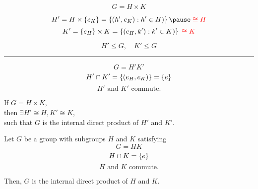 
\begin{frame}{}
  \[
	G = H \times K
  \]

  \begin{definition}
	\[
	  H' = H \times \set{e_{K}} = \set{(h', e_{K}): h' \in H)} \pause \;\red{\cong H}
	\]
	\pause \vspace{-0.50cm}
	\[
	  K' = \left\{e_{H}\right\} \times K = \left\{(e_{H}, k'): k' \in K)\right\} \;\textcolor{red}{\cong K}
	\]
  \end{definition}

  \pause
  \[
	H' \le G, \quad K' \le G
  \]

  \pause
  \vspace{-0.60cm}
  \begin{center}
	\rule{8cm}{0.6pt}
  \end{center}
  \vspace{-0.60cm}

  \[
	G = H'K'
  \]
  \pause \vspace{-0.30cm}
  \[
	H' \cap K' = \left\{(e_{H}, e_{K})\right\} = \left\{e\right\}
  \]
  \pause \vspace{-0.30cm}
  \[
	H' \text{ and } K' \text{ commute}.
  \]
\end{frame}

\begin{frame}{}
  \begin{theorem}
	\begin{center}
	  If $G = H \times K$, \\[5pt]
	  then $\exists H' \cong H, K' \cong K$, \\[5pt]
	  such that $G$ is the internal direct product of $H'$ and $K'$.
	\end{center}
  \end{theorem}

  \pause
  \vspace{0.50cm}
  \begin{definition}
	Let $G$ be a group with subgroups $H$ and $K$ satisfying
	\[
	  G = HK
	\]
	\[
	  H \cap K = \left\{e\right\}
	\]
	\[
	  H \text{ and } K \text{ commute}.
	\]

	Then, $G$ is the internal direct product of $H$ and $K$.
  \end{definition}
\end{frame}

